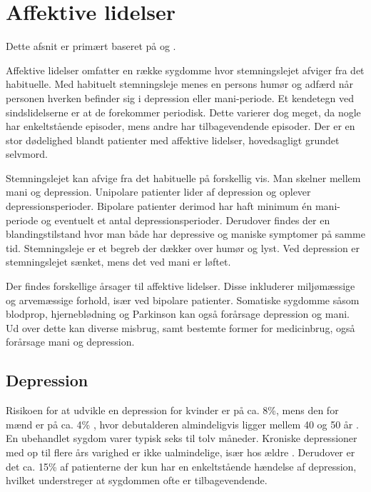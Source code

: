 
\section{Affektive lidelser}\label{sec:affektivelidelser}
Dette afsnit er primært baseret på \citet{misc:affektivelidelser} og \citet{misc:netpsykdepression, misc:netpsykmani}.

Affektive lidelser omfatter en række sygdomme hvor stemningslejet afviger fra det habituelle.
Med habituelt stemningsleje menes en persons humør og adfærd når personen hverken befinder sig i depression eller mani-periode.
Et kendetegn ved sindslidelserne er at de forekommer periodisk.
Dette varierer dog meget, da nogle har enkeltstående episoder, mens andre har tilbagevendende episoder.
Der er en stor dødelighed blandt patienter med affektive lidelser, hovedsagligt grundet selvmord.

Stemningslejet kan afvige fra det habituelle på forskellig vis.
Man skelner mellem mani og depression.
Unipolare patienter lider af depression og oplever depressionsperioder.
Bipolare patienter derimod har haft minimum én mani-periode og eventuelt et antal depressionsperioder.
Derudover findes der en blandingstilstand hvor man både har depressive og maniske symptomer på samme tid.
Stemningsleje er et begreb der dækker over humør og lyst.
Ved depression er stemningslejet sænket, mens det ved mani er løftet.

Der findes forskellige årsager til affektive lidelser. 
Disse inkluderer miljømæssige og arvemæssige forhold, især ved bipolare patienter.
Somatiske sygdomme såsom blodprop, hjerneblødning og Parkinson kan også forårsage depression og mani.
Ud over dette kan diverse misbrug, samt bestemte former for medicinbrug, også forårsage mani og depression.

\subsection{Depression}
Risikoen for at udvikle en depression for kvinder er på ca. 8\%, mens den for mænd er på ca. 4\% \citep{misc:affektivelidelser}, hvor debutalderen almindeligvis ligger mellem 40 og 50 år \citep{misc:affektivelidelser}.
En ubehandlet sygdom varer typisk seks til tolv måneder.
Kroniske depressioner med op til flere års varighed er ikke ualmindelige, især hos ældre \citep{misc:affektivelidelser}.
Derudover er det ca. 15\% af patienterne der kun har en enkeltstående hændelse af depression, hvilket understreger at sygdommen ofte er tilbagevendende.

